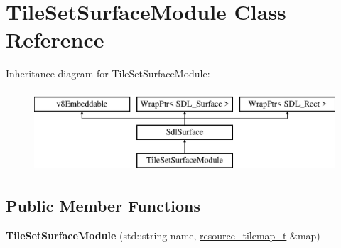 \hypertarget{classTileSetSurfaceModule}{}\section{Tile\+Set\+Surface\+Module Class Reference}
\label{classTileSetSurfaceModule}
Inheritance diagram for Tile\+Set\+Surface\+Module\+:\begin{figure}[H]
\begin{center}
\leavevmode
\includegraphics[height=3.000000cm]{classTileSetSurfaceModule}
\end{center}
\end{figure}
\subsection*{Public Member Functions}
\begin{DoxyCompactItemize}
\item 
\mbox{\label{classTileSetSurfaceModule_af949ba6759046dc35a6ee33c22a16cc1}} 
{\bfseries Tile\+Set\+Surface\+Module} (std\+::string name, \mbox{\hyperlink{classWrapPtr}{resource\+\_\+tilemap\+\_\+t}} \&map)
\end{DoxyCompactItemize}
